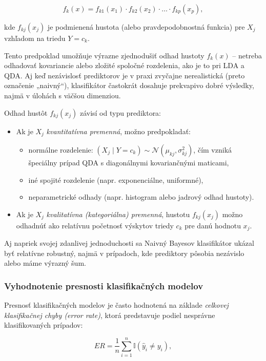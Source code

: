 \begin{equation}
f_k(x) = f_{k1}(x_1) \cdot f_{k2}(x_2) \cdot \dots \cdot f_{kp}(x_p),
\end{equation}

kde $f_{kj}(x_j)$ je podmienená hustota (alebo pravdepodobnostná funkcia) pre $X_j$ vzhľadom na triedu $Y = c_k$.

Tento predpoklad umožňuje výrazne zjednodušiť odhad hustoty $f_k(x)$ – netreba odhadovať kovariancie alebo zložité spoločné rozdelenia, ako je to pri LDA a QDA. Aj keď nezávislosť prediktorov je v praxi zvyčajne nerealistická (preto označenie „naivný“), klasifikátor častokrát dosahuje prekvapivo dobré výsledky, najmä v úlohách s väčšou dimenziou.

\medskip
\noindent
Odhad hustôt $f_{kj}(x_j)$ závisí od typu prediktora:
\begin{itemize}
  \item Ak je $X_j$ \textit{kvantitatívna premenná}, možno predpokladať:
  \begin{itemize}
    \item normálne rozdelenie: $(X_j \mid Y = c_k) \sim \mathcal{N}(\mu_{kj}, \sigma^2_{kj})$, čím vzniká špeciálny prípad QDA s diagonálnymi kovariančnými maticami,
    \item iné spojité rozdelenie (napr. exponenciálne, uniformné),
    \item neparametrické odhady (napr. histogram alebo jadrový odhad hustoty).
  \end{itemize}
  \item Ak je $X_j$ \textit{kvalitatívna (kategoriálna) premenná}, hustotu $f_{kj}(x_j)$ možno odhadnúť ako relatívnu početnosť výskytov triedy $c_k$ pre danú hodnotu $x_j$.
\end{itemize}

\noindent
Aj napriek svojej zdanlivej jednoduchosti sa Naivný Bayesov klasifikátor ukázal byť relatívne robustný, najmä v prípadoch, kde prediktory pôsobia nezávislo alebo máme výrazný šum.

\subsubsection{Vyhodnotenie presnosti klasifikačných modelov}

Presnosť klasifikačných modelov je často hodnotená na základe \textit{celkovej klasifikačnej chyby (error rate)}, ktorá predstavuje podiel nesprávne klasifikovaných prípadov:

\begin{equation}
ER = \frac{1}{n} \sum_{i=1}^{n} \mathbb{I}(\hat{y}_i \neq y_i),
\end{equation}

